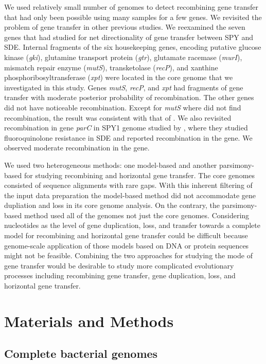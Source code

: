 \documentclass[english]{article}
\begin{document}
We used relatively small number of genomes to detect recombining gene transfer
that had only been possible using many samples for a few genes. We revisited the
problem of gene transfer in other previous studies.  We reexamined the seven
genes that \citet{Kalia2001} had studied for net directionality of gene transfer
between SPY and SDE.  Internal fragments of the six housekeeping genes, encoding
putative glucose kinase (\textit{gki}), glutamine transport protein
(\textit{gtr}), glutamate racemase (\textit{murI}), mismatch repair enzyme
(\textit{mutS}), transketolase (\textit{recP}), and xanthine
phosphoribosyltransferase (\textit{xpt}) were located in the core genome that we
investigated in this study.  Genes \textit{mutS}, \textit{recP}, and
\textit{xpt} had fragments of gene transfer with moderate posterior probability
of recombination. The other genes did not have noticeable recombination. Except
for \textit{mutS} where \citet{Kalia2001} did not find recombination, the result
was consistent with that of \citet{Kalia2001}.  We also revisited recombination
in gene \textit{parC} in SPY1 genome studied by \citet{Pinho2010}, where they
studied fluoroquinolone resistance in SDE and reported recombination in the
gene. We observed moderate recombination in the gene. 

We used two heterogeneous methods: one model-based and another parsimony-based
for studying recombining and horizontal gene transfer.  The core genomes
consisted of sequence alignments with rare gaps. With this inherent filtering of
the input data preparation the model-based method did not accommodate gene
dupliation and loss in its core genome analysis. On the contrary, the
parsimony-based method used all of the genomes not just the core genomes.
Considering nucleotides as the level of gene duplication, loss, and transfer
towards a complete model for recombining and horizontal gene transfer could be
difficult because genome-scale application of those models based on DNA or
protein sequences might not be feasible.  Combining the two approaches for
studying the mode of gene transfer would be desirable to study more complicated
evolutionary processes including recombining gene transfer, gene duplication,
loss, and horizontal gene transfer.

\section{Materials and Methods}

\subsection{Complete bacterial genomes}
\end{document}
